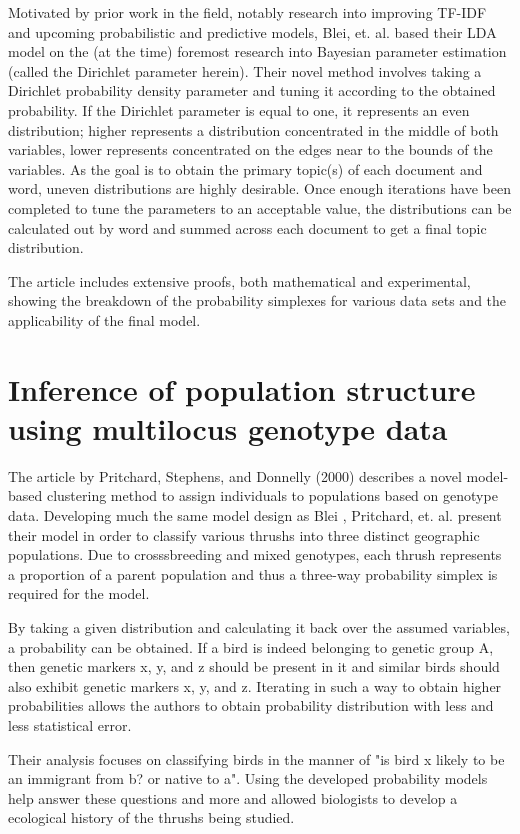 \documentclass{article}
\begin{document}
Motivated by prior work in the field, notably research into improving TF-IDF and upcoming probabilistic and predictive models, Blei, et. al. based their LDA model on the (at the time) foremost research into Bayesian parameter estimation (called the Dirichlet parameter herein). Their novel method involves taking a Dirichlet probability density parameter and tuning it according to the obtained probability. If the Dirichlet parameter is equal to one, it represents an even distribution; higher represents a distribution concentrated in the middle of both variables, lower represents concentrated on the edges near to the bounds of the variables. As the goal is to obtain the primary topic(s) of each document and word, uneven distributions are highly desirable. Once enough iterations have been completed to tune the parameters to an acceptable value, the distributions can be calculated out by word and summed across each document to get a final topic distribution.

The article includes extensive proofs, both mathematical and experimental, showing the breakdown of the probability simplexes for various data sets and the applicability of the final model.

\section{Inference of population structure using multilocus genotype data}

The article by Pritchard, Stephens, and Donnelly (2000) \cite{pritchard2000inference} describes a novel model-based clustering method to assign individuals to populations based on genotype data. Developing much the same model design as Blei \cite{blei2003latent}, Pritchard, et. al. present their model in order to classify various thrushs into three distinct geographic populations. Due to crosssbreeding and mixed genotypes, each thrush represents a proportion of a parent population and thus a three-way probability simplex is required for the model.

By taking a given distribution and calculating it back over the assumed variables, a probability can be obtained. If a bird is indeed belonging to genetic group A, then genetic markers x, y, and z should be present in it and similar birds should also exhibit genetic markers x, y, and z. Iterating in such a way to obtain higher probabilities allows the authors to obtain probability distribution with less and less statistical error.

Their analysis focuses on classifying birds in the manner of "is bird x likely to be an immigrant from b? or native to a". Using the developed probability models help answer these questions and more and allowed biologists to develop a ecological history of the thrushs being studied.
\end{document}
